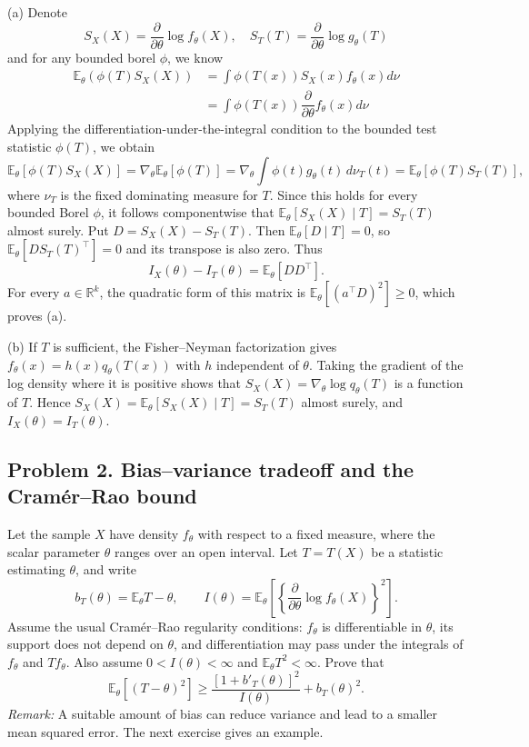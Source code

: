 \documentclass[lang=en,11pt,a4paper,citestyle=authoryear,nobib=true]{elegantpaper}
\newcommand{\R}{\mathbb{R}}
\newcommand{\E}{\mathbb{E}}
\begin{document}
(a) Denote
\[S_X(X) = \dfrac{\partial}{\partial \theta}\log f_{\theta}(X),\quad S_T(T) = \dfrac{\partial}{\partial \theta}\log g_{\theta}(T)\]
and for any bounded borel $\phi$, we know
\[
\begin{aligned}
    \mathbb{E}_{\theta}\left(\phi(T)S_X(X)\right) &= \int \phi(T(x))S_X(x)f_{\theta}(x)d\nu \\
    &= \int \phi(T(x))\dfrac{\partial}{\partial\theta}f_{\theta}(x)d\nu
\end{aligned}
\]
Applying the differentiation-under-the-integral condition to the bounded
test statistic \(\phi(T)\), we obtain
\[
\E_\theta[\phi(T)S_X(X)]
=\nabla_\theta\E_\theta[\phi(T)]
=\nabla_\theta\int \phi(t)g_\theta(t)\,d\nu_T(t)
=\E_\theta[\phi(T)S_T(T)],
\]
where \(\nu_T\) is the fixed dominating measure for \(T\).
Since this holds for every bounded Borel \(\phi\), it follows componentwise
that \(\E_\theta[S_X(X)\mid T]=S_T(T)\) almost surely. Put
\(D=S_X(X)-S_T(T)\). Then \(\E_\theta[D\mid T]=0\), so
\(\E_\theta[DS_T(T)^\top]=0\) and its transpose is also zero. Thus
\[
I_X(\theta)-I_T(\theta)=\E_\theta[DD^\top].
\]
For every \(a\in\R^k\), the quadratic form of this matrix is
\(\E_\theta[(a^\top D)^2]\ge 0\), which proves (a).

\noindent (b) If \(T\) is sufficient, the Fisher--Neyman factorization
gives \(f_\theta(x)=h(x)q_\theta(T(x))\) with \(h\) independent of
\(\theta\). Taking the gradient of the log density where it is positive
shows that \(S_X(X)=\nabla_\theta\log q_\theta(T)\) is a function of \(T\).
Hence \(S_X(X)=\E_\theta[S_X(X)\mid T]=S_T(T)\) almost surely, and
\(I_X(\theta)=I_T(\theta)\).
\vspace{3em}

\subsection*{Problem 2. Bias--variance tradeoff and the Cram\'er--Rao bound}
Let the sample $X$ have density $f_\theta$ with respect to a fixed
measure, where the scalar parameter $\theta$ ranges over an open interval.
Let $T=T(X)$ be a statistic estimating $\theta$, and write
\[
b_T(\theta)=\E_\theta T-\theta,\qquad
I(\theta)=\E_\theta\left[
\left\{\frac{\partial}{\partial\theta}\log f_\theta(X)\right\}^2
\right].
\]
Assume the usual Cram\'er--Rao regularity conditions: $f_\theta$ is
differentiable in $\theta$, its support does not depend on $\theta$,
and differentiation may pass under the integrals of $f_\theta$ and
$Tf_\theta$. Also assume $0<I(\theta)<\infty$ and
$\E_\theta T^2<\infty$. Prove that
\[
\E_\theta[(T-\theta)^2]\ge
\frac{[1+b'_T(\theta)]^2}{I(\theta)}+b_T(\theta)^2.
\]
\noindent\textit{Remark:} A suitable amount of bias can reduce variance
and lead to a smaller mean squared error. The next exercise gives an example.
\end{document}
